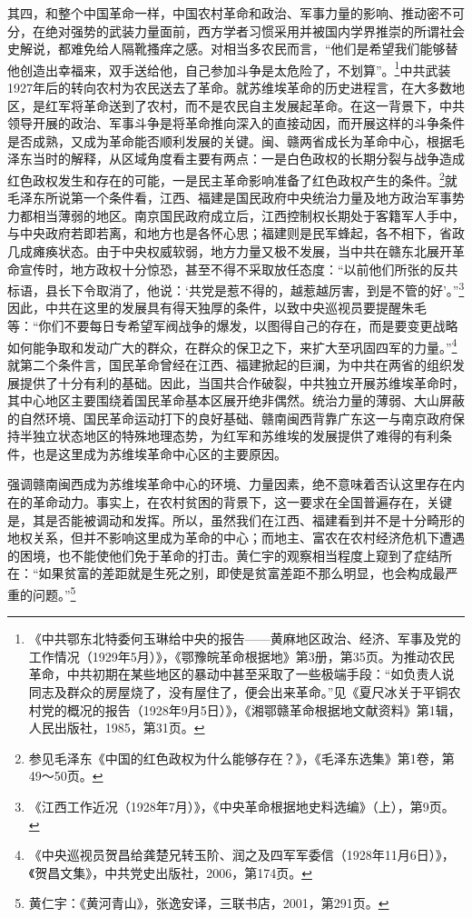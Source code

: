 其四，和整个中国革命一样，中国农村革命和政治、军事力量的影响、推动密不可分，在绝对强势的武装力量面前，西方学者习惯采用并被国内学界推崇的所谓社会史解说，都难免给人隔靴搔痒之感。对相当多农民而言，“他们是希望我们能够替他创造出幸福来，双手送给他，自己参加斗争是太危险了，不划算”。\footnote{《中共鄂东北特委何玉琳给中央的报告——黄麻地区政治、经济、军事及党的工作情况（1929年5月）》，《鄂豫皖革命根据地》第3册，第35页。为推动农民革命，中共初期在某些地区的暴动中甚至采取了一些极端手段：“如负责人说同志及群众的房屋烧了，没有屋住了，便会出来革命。”见《夏尺冰关于平铜农村党的概况的报告（1928年9月5日）》，《湘鄂赣革命根据地文献资料》第1辑，人民出版社，1985，第31页。}中共武装1927年后的转向农村为农民送去了革命。就苏维埃革命的历史进程言，在大多数地区，是红军将革命送到了农村，而不是农民自主发展起革命。在这一背景下，中共领导开展的政治、军事斗争是将革命推向深入的直接动因，而开展这样的斗争条件是否成熟，又成为革命能否顺利发展的关键。闽、赣两省成长为革命中心，根据毛泽东当时的解释，从区域角度看主要有两点：一是白色政权的长期分裂与战争造成红色政权发生和存在的可能，一是民主革命影响准备了红色政权产生的条件。\footnote{参见毛泽东《中国的红色政权为什么能够存在？》，《毛泽东选集》第1卷，第49～50页。}就毛泽东所说第一个条件看，江西、福建是国民政府中央统治力量及地方政治军事势力都相当薄弱的地区。南京国民政府成立后，江西控制权长期处于客籍军人手中，与中央政府若即若离，和地方也是各怀心思；福建则是民军蜂起，各不相下，省政几成瘫痪状态。由于中央权威软弱，地方力量又极不发展，当中共在赣东北展开革命宣传时，地方政权十分惊恐，甚至不得不采取放任态度：“以前他们所张的反共标语，县长下令取消了，他说：‘共党是惹不得的，越惹越厉害，到是不管的好’。”\footnote{《江西工作近况（1928年7月）》，《中央革命根据地史料选编》（上），第9页。}因此，中共在这里的发展具有得天独厚的条件，以致中央巡视员要提醒朱毛等：“你们不要每日专希望军阀战争的爆发，以图得自己的存在，而是要变更战略如何能争取和发动广大的群众，在群众的保卫之下，来扩大至巩固四军的力量。”\footnote{《中央巡视员贺昌给龚楚兄转玉阶、润之及四军军委信（1928年11月6日）》，《贺昌文集》，中共党史出版社，2006，第174页。}就第二个条件言，国民革命曾经在江西、福建掀起的巨澜，为中共在两省的组织发展提供了十分有利的基础。因此，当国共合作破裂，中共独立开展苏维埃革命时，其中心地区主要围绕着国民革命基本区展开绝非偶然。统治力量的薄弱、大山屏蔽的自然环境、国民革命运动打下的良好基础、赣南闽西背靠广东这一与南京政府保持半独立状态地区的特殊地理态势，为红军和苏维埃的发展提供了难得的有利条件，也是这里成为苏维埃革命中心区的主要原因。


强调赣南闽西成为苏维埃革命中心的环境、力量因素，绝不意味着否认这里存在内在的革命动力。事实上，在农村贫困的背景下，这一要求在全国普遍存在，关键是，其是否能被调动和发挥。所以，虽然我们在江西、福建看到并不是十分畸形的地权关系，但并不影响这里成为革命的中心；而地主、富农在农村经济危机下遭遇的困境，也不能使他们免于革命的打击。黄仁宇的观察相当程度上窥到了症结所在：“如果贫富的差距就是生死之别，即使是贫富差距不那么明显，也会构成最严重的问题。”\footnote{黄仁宇：《黄河青山》，张逸安译，三联书店，2001，第291页。}


